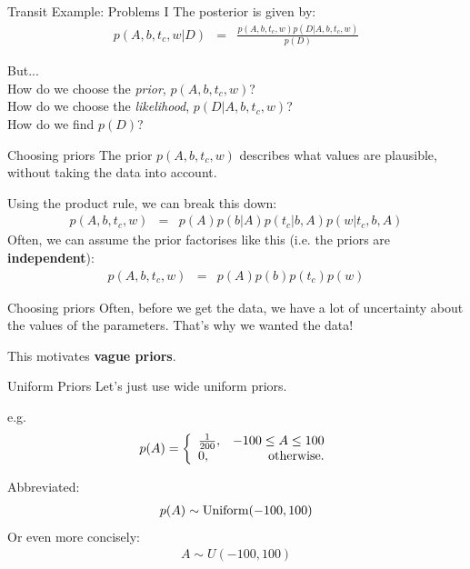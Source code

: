 \begin{frame}[fragile, t]{Transit Example: Problems I}
The posterior is given by:
\begin{eqnarray*}
p(A, b, t_c, w | D) &=& \frac{p(A, b, t_c, w)p(D | A, b, t_c, w)}{p(D)}
\end{eqnarray*}

But...\\
How do we choose the {\it prior}, $p(A, b, t_c, w)$?\\
How do we choose the {\it likelihood}, $p(D | A, b, t_c, w)$?\\
How do we find $p(D)$?
\end{frame}


\begin{frame}[t]{Choosing priors}
The prior $p(A, b, t_c, w)$
describes what values are plausible, without taking the data into account.

Using the product rule, we can break this down:
\begin{eqnarray*}
p(A, b, t_c, w) &=& p(A) p(b | A) p(t_c | b, A) p(w | t_c, b, A)
\end{eqnarray*}
Often, we can assume the prior factorises like this (i.e. the priors are
{\bf independent}):
\begin{eqnarray*}
p(A, b, t_c, w) &=& p(A) p(b) p(t_c) p(w)
\end{eqnarray*}


\end{frame}


\begin{frame}[t]{Choosing priors}
Often, before we get the data, we have a lot of uncertainty about the
values of the parameters. That's why we wanted the data!

This motivates {\bf vague priors}.

\end{frame}


\begin{frame}[t]{Uniform Priors}
Let's just use wide uniform priors.

e.g.
\begin{eqnarray*}
p(A) = \left\{
\begin{array}{lr}
\frac{1}{200}, & -100 \leq A \leq 100\\
0, & \textnormal{otherwise.}
\end{array}
\right.
\end{eqnarray*}

Abbreviated:
\begin{eqnarray*}
p(A) \sim \textnormal{Uniform}(-100, 100)
\end{eqnarray*}
Or even more concisely:
\begin{eqnarray*}
A \sim U(-100, 100)
\end{eqnarray*}

\end{frame}


